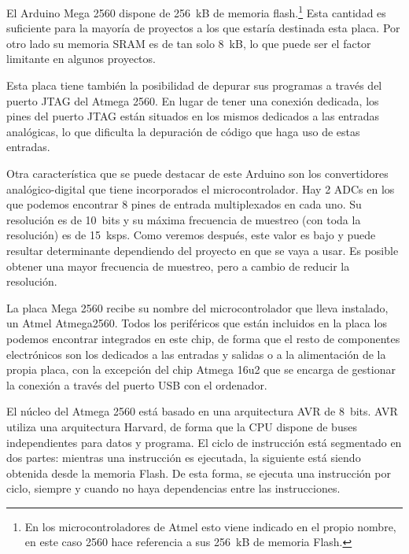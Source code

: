 El Arduino Mega 2560 dispone de 256~kB de memoria flash.\footnote{En los microcontroladores de Atmel esto viene indicado en el propio nombre, en este caso 2560 hace referencia a sus 256~kB de memoria Flash.} Esta cantidad es suficiente para la mayoría de proyectos a los que estaría destinada esta placa. Por otro lado su memoria SRAM es de tan solo 8~kB, lo que puede ser el factor limitante en algunos proyectos.

Esta placa tiene también la posibilidad de depurar sus programas a través del puerto JTAG del Atmega 2560. En lugar de tener una conexión dedicada, los pines del puerto JTAG están situados en los mismos dedicados a las entradas analógicas, lo que dificulta la depuración de código que haga uso de estas entradas.

Otra característica que se puede destacar de este Arduino son los convertidores analógico-digital que tiene incorporados el microcontrolador. Hay 2 ADCs en los que podemos encontrar 8 pines de entrada multiplexados en cada uno. Su resolución es de 10~bits y su máxima frecuencia de muestreo (con toda la resolución) es de 15~ksps. Como veremos después, este valor es bajo y puede resultar determinante dependiendo del proyecto en que se vaya a usar. Es posible obtener una mayor frecuencia de muestreo, pero a cambio de reducir la resolución.

La placa Mega 2560 recibe su nombre del microcontrolador que lleva instalado, un Atmel Atmega2560. Todos los periféricos que están incluidos en la placa los podemos encontrar integrados en este chip, de forma que el resto de componentes electrónicos son los dedicados a las entradas y salidas o a la alimentación de la propia placa, con la excepción del chip Atmega 16u2 que se encarga de gestionar la conexión a través del puerto USB con el ordenador.

El núcleo del Atmega 2560 está basado en una arquitectura AVR de 8~bits. AVR utiliza una arquitectura Harvard, de forma que la CPU dispone de buses independientes para datos y programa. El ciclo de instrucción está segmentado en dos partes: mientras una instrucción es ejecutada, la siguiente está siendo obtenida desde la memoria Flash. De esta forma, se ejecuta una instrucción por ciclo, siempre y cuando no haya dependencias entre las instrucciones.

